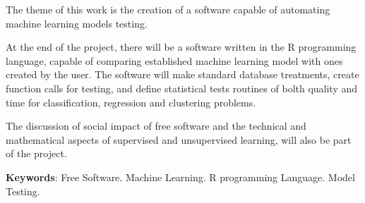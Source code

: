 


\begin{resumo}[Abstract]
The theme of this work is the creation of a software capable of automating machine learning models testing.

At the end of the project, there will be a software written in the R programming language, capable of comparing established machine learning model  with ones created by the user. The software will make standard database treatments, create function calls for testing, and define statistical tests routines of bolth quality and time for classification, regression and clustering problems.

The discussion of social impact of free software and the technical and mathematical aspects of supervised and unsupervised learning, will also be part of the project.

\textbf{Keywords}: Free Software. Machine Learning. R programming Language. Model Testing.


\end{resumo}



